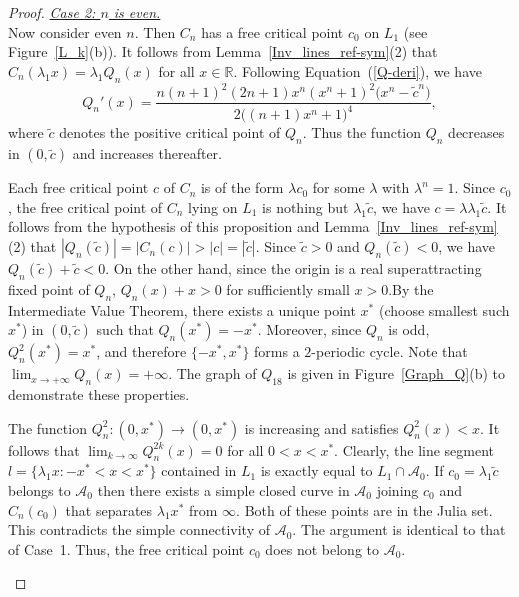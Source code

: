 \documentclass[12pt]{article}
\begin{document}
\begin{proof}
	
	\noindent	\underline{\textit{Case 2: $n$ is even.}}\\
	Now consider even $n$. Then $C_n$ has a free critical point $c_0$ on $L_1$ (see Figure~\ref{L_k}(b)).
	It follows from Lemma~\ref{Inv_lines_ref-sym}(2) that $C_{n} (\lambda_1 x)=\lambda_1 Q_n (x)$ for all $x \in \mathbb{R}$.
	Following Equation~(\ref{Q-deri}), we have
	$$Q_n'(x) = \frac{n(n+1)^2(2n+1)x^{n}(x^{n}+1)^{2} \big(x^{n} - \tilde{c}^n\big)}{2\big((n+1)x^{n}+1\big)^4},$$
	where $\tilde{c}$ denotes the positive critical point of $Q_n$. Thus the function  $Q_n$ decreases in $(0, \tilde{c})$ and increases thereafter.
	\par  
	Each free critical point $c$ of $C_n$ is of the form $\lambda c_0$ for some $\lambda$ with $\lambda^n =1$. Since $c_0$, the free critical point of $C_n$ lying on $L_1$ is nothing but $\lambda_1 \tilde{c}$, we have $c= \lambda \lambda_1 \tilde{c}$. It follows from the hypothesis of this proposition and Lemma~\ref{Inv_lines_ref-sym} (2) that $|Q_n (\tilde{c})|=|C_n (c)|> |c| =|\tilde{c}|$. Since $\tilde{c}>0$ and $Q_n (\tilde{c}) <0$, we have $Q_n (\tilde{c}) +\tilde{c}<0$.  On the other hand, since the origin is a real superattracting fixed point of $Q_n$, $Q_n (x)+x>0$ for sufficiently small $x>0$.By the Intermediate Value Theorem, there exists a unique point $x^*$ (choose smallest such $x^*$) in $(0, \tilde{c})$ such that $Q_n(x^*) = -x^*$.  Moreover, since $Q_n$ is odd, $Q_n^2(x^*) = x^*$, and therefore  
	$\{-x^*, x^*\}$ forms a $2$-periodic cycle. Note that $\lim_{x \to +\infty}Q_n (x)=+\infty.$ The graph of $Q_{18}$ is given in Figure~\ref{Graph_Q}(b) to demonstrate these properties.
	\par  
	The function $Q_n ^2: (0, x^*) \to (0, x^*)$ is increasing and satisfies $Q_n ^2 (x)<x$. It follows that $\lim_{k \to \infty}Q_n ^{2k} (x)=0$ for all $0< x < x^*$. Clearly, the line segment $l=\{\lambda_1 x: -x^* < x< x^*\}$ contained in $L_1$ is exactly equal to $L_1 \cap \mathcal{A}_0$. If $c_0 =\lambda_1 \tilde{c}$ belongs to $\mathcal{A}_0$ then there exists a simple closed curve in $\mathcal{A}_0$ joining $c_0$ and $C_n (c_0)$ that separates $\lambda_1 x^*$ from $\infty$. Both of these points are in the Julia set. This contradicts the simple connectivity of $\mathcal{A}_0$. The argument is identical to that of Case~1. Thus, the free critical point $c_0$ does not belong to $\mathcal{A}_{0}$. 
	\begin{figure}[htbp]
		\centering
		\begin{tikzpicture}[scale=1.5]
		

\end{tikzpicture}
\end{figure}
\end{proof}
\end{document}
